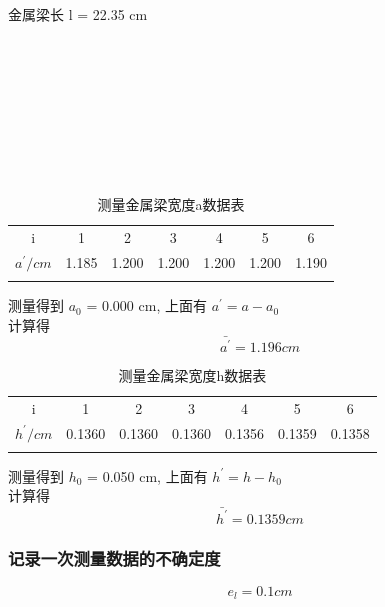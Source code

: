 \documentclass[a4paper,11pt]{article}
\begin{document}
金属梁长 l = 22.35 cm \\
\\
\\
\\
\\
\\
\\
\\
\\

\begin{table}[htbp]%
	\centering
	\caption{测量金属梁宽度a数据表}
	\label{tab:1}  
	\begin{tabular}{cccc ccc}
		\hline\hline\noalign{\smallskip}	
		i    & 1 & 2 & 3 & 4 & 5 & 6     \\
		\noalign{\smallskip}\hline\noalign{\smallskip}
		$ a^{\prime}/cm $ & 1.185 & 1.200 & 1.200  & 1.200 & 1.200 & 1.190      \\
		\noalign{\smallskip}\hline
		
	\end{tabular}
\end{table}

测量得到 $a_0$ = 0.000 cm,
上面有 $ a^{\prime} = a - a_0 $\\
计算得$$ \bar{a^{\prime}} = 1.196 cm $$

\begin{table}[htbp]%
	\centering
	\caption{测量金属梁宽度h数据表}
	\label{tab:1}  
	\begin{tabular}{cccc ccc}
		\hline\hline\noalign{\smallskip}	
		i    & 1 & 2 & 3 & 4 & 5 & 6     \\
		\noalign{\smallskip}\hline\noalign{\smallskip}
		$ h^{\prime}/cm $ & 0.1360 & 0.1360 & 0.1360  & 0.1356 & 0.1359 & 0.1358      \\
		\noalign{\smallskip}\hline
		
	\end{tabular}
\end{table}

测量得到 $h_0$ = 0.050 cm,
上面有 $ h^{\prime} = h - h_0 $\\
计算得$$ \bar{h^{\prime}} = 0.1359 cm $$

\subsubsection{记录一次测量数据的不确定度}
$$ e_{l} = 0.1 cm $$
\end{document}
